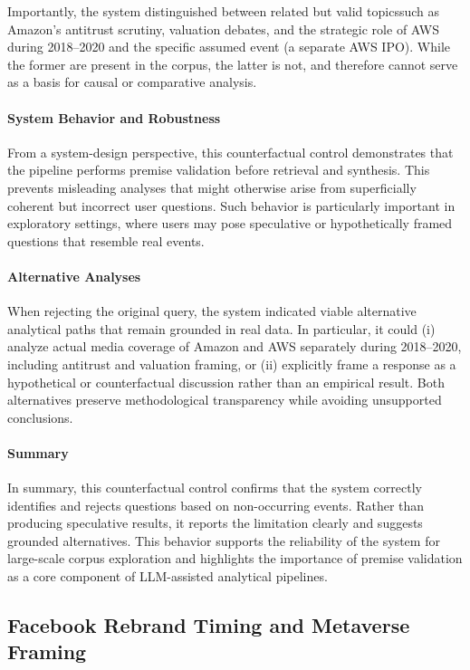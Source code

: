 Importantly, the system distinguished between related but valid topicssuch as Amazon’s antitrust scrutiny, valuation debates, and the strategic role of AWS during 2018--2020 and the specific assumed event (a separate AWS IPO). While the former are present in the corpus, the latter is not, and therefore cannot serve as a basis for causal or comparative analysis.

\paragraph{System Behavior and Robustness}

From a system-design perspective, this counterfactual control demonstrates that the pipeline performs premise validation before retrieval and synthesis. This prevents misleading analyses that might otherwise arise from superficially coherent but incorrect user questions. Such behavior is particularly important in exploratory settings, where users may pose speculative or hypothetically framed questions that resemble real events.

\paragraph{Alternative Analyses}

When rejecting the original query, the system indicated viable alternative analytical paths that remain grounded in real data. In particular, it could (i) analyze actual media coverage of Amazon and AWS separately during 2018--2020, including antitrust and valuation framing, or (ii) explicitly frame a response as a hypothetical or counterfactual discussion rather than an empirical result. Both alternatives preserve methodological transparency while avoiding unsupported conclusions.

\paragraph{Summary}

In summary, this counterfactual control confirms that the system correctly identifies and rejects questions based on non-occurring events. Rather than producing speculative results, it reports the limitation clearly and suggests grounded alternatives. This behavior supports the reliability of the system for large-scale corpus exploration and highlights the importance of premise validation as a core component of LLM-assisted analytical pipelines.

\subsection{Facebook Rebrand Timing and Metaverse Framing}

